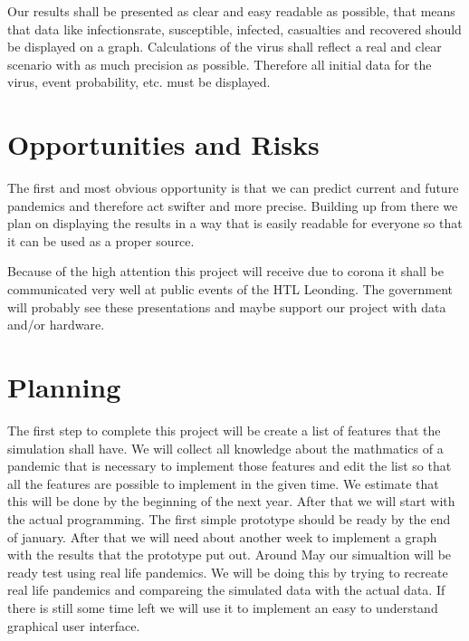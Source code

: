 \documentclass[12pt]{article}
\theoremstyle{definition}
\begin{document}
Our results shall be presented as clear and easy readable as possible, 
that means that data like infectionsrate, susceptible, infected, casualties and recovered should be displayed on a graph.
Calculations of the virus shall reflect a real and clear scenario with as much precision as possible.
Therefore all initial data for the virus, event probability, etc. must be displayed.

\pagebreak
\section{Opportunities and Risks}

The first and most obvious opportunity is that we can predict current and future pandemics and therefore act swifter and more precise.
Building up from there we plan on displaying the results in a way that is easily readable for everyone so that it can be used as a proper source.

Because of the high attention this project will receive due to corona it shall be communicated very well at public events of the HTL Leonding.
The government will probably see these presentations and maybe support our project with data and/or hardware.



\pagebreak
\section{Planning}

The first step to complete this project will be create a list of features that the simulation shall have. 
We will collect all knowledge about the mathmatics of a pandemic that is necessary to implement those features and edit the list so that all the features are possible to implement in the given time.
We estimate that this will be done by the beginning of the next year. After that we will start with the actual programming.
The first simple prototype should be ready by the end of january. After that we will need about another week to implement a graph with the results that the prototype put out.
Around May our simualtion will be ready test using real life pandemics. We will be doing this by trying to recreate real life pandemics and compareing the simulated data with the actual data.
If there is still some time left we will use it to implement an easy to understand graphical user interface.
\end{document}
